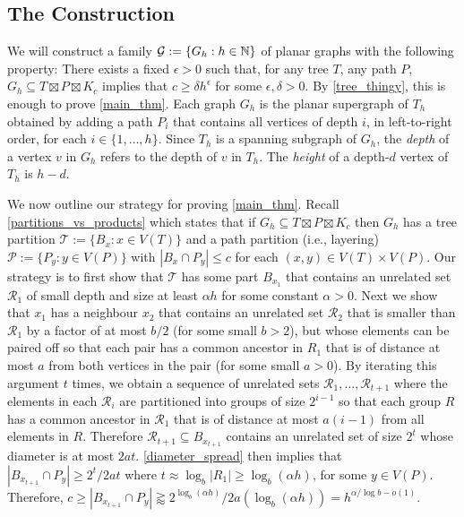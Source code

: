\documentclass{patmorin}
\newcommand{\defin}[1]{\emph{\color{brightmaroon}#1}}
\renewcommand{\le}{\leqslant}
\renewcommand{\ge}{\geqslant}
\begin{document}
\subsection{The Construction}


We will construct a family $\mathcal{G}:=\{G_{h}:h\in\mathbb{N}\}$ of planar graphs with the following property:  There exists a fixed $\epsilon >0$ such that, for any tree $T$, any path $P$, $G_{h}\subseteq T\boxtimes P\boxtimes K_c$ implies that $c\ge \delta h^\epsilon$ for some $\epsilon,\delta >0$.  By \cref{tree_thingy}, this is enough to prove \cref{main_thm}.  Each graph $G_{h}$ is the planar supergraph of $T_h$ obtained by adding a path $P_i$ that contains all vertices of depth $i$, in left-to-right order, for each $i\in\{1,\ldots,h\}$.   Since $T_h$ is a spanning subgraph of $G_h$, the \defin{depth} of a vertex $v$ in $G_h$ refers to the depth of $v$ in $T_h$.  The \defin{height} of a depth-$d$ vertex of $T_h$ is $h-d$.


We now outline our strategy for proving \cref{main_thm}.  Recall \cref{partitions_vs_products} which states that if $G_h\subseteq T\boxtimes P\boxtimes K_c$ then $G_h$ has a tree partition $\mathcal{T}:=\{B_x:x\in V(T)\}$ and a path partition (i.e., layering) $\mathcal{P}:=\{P_y:y\in V(P)\}$ with $|B_x\cap P_y|\le c$ for each $(x,y)\in V(T)\times V(P)$. Our strategy is to first show that $\mathcal{T}$ has some part $B_{x_1}$ that contains an unrelated set $\mathcal{R}_1$ of small depth and size at least $\alpha h$ for some constant $\alpha >0$.  Next we show that $x_1$ has a neighbour $x_2$ that contains an unrelated set $\mathcal{R}_2$ that is smaller than $\mathcal{R}_1$ by a factor of at most $b/2$ (for some small $b>2$), but whose elements can be paired off so that each pair has a common ancestor in $R_1$ that is of distance at most $a$ from both vertices in the pair (for some small $a>0$).  By iterating this argument $t$ times, we obtain a sequence of unrelated sets $\mathcal{R}_1,\ldots,\mathcal{R}_{t+1}$ where the elements in each $\mathcal{R}_i$ are partitioned into groups of size $2^{i-1}$ so that each group $R$ has a common ancestor in $\mathcal{R}_1$ that is of distance at most $a(i-1)$ from all elements in $R$.  Therefore $\mathcal{R}_{t+1}\subseteq B_{x_{t+1}}$ contains an unrelated set of size $2^{t}$ whose diameter is at most $2at$.  \cref{diameter_spread} then implies that $|B_{x_{t+1}}\cap P_y|\ge 2^{t}/2at$ where $t\approx\log_b |R_1|\ge \log_{b}(\alpha h)$, for some $y\in V(P)$. Therefore, $c\ge |B_{x_{t+1}}\cap P_y|\gtrapprox 2^{\log_{b}(\alpha h)}/2a(\log_{b}(\alpha h))=h^{\alpha/\log b-o(1)}$.
\end{document}
